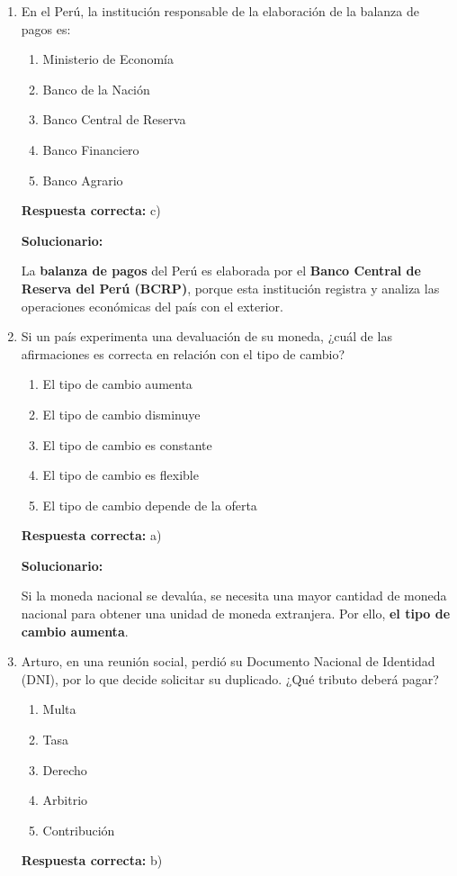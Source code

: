 \begin{enumerate}[resume]
	
	\item En el Perú, la institución responsable de la elaboración de la balanza de pagos es:
	\begin{enumerate}[label=\alph*)]
		\item Ministerio de Economía
		\item Banco de la Nación
		\item Banco Central de Reserva
		\item Banco Financiero
		\item Banco Agrario
	\end{enumerate}
	\textbf{Respuesta correcta:} c)
	
	\vspace{2mm}
	\textbf{Solucionario:}
	
	La \textbf{balanza de pagos} del Perú es elaborada por el \textbf{Banco Central de Reserva del Perú (BCRP)}, porque esta institución registra y analiza las operaciones económicas del país con el exterior.
	
	\vspace{6mm}
	
	\item Si un país experimenta una devaluación de su moneda, ¿cuál de las afirmaciones es correcta en relación con el tipo de cambio?
	\begin{enumerate}[label=\alph*)]
		\item El tipo de cambio aumenta
		\item El tipo de cambio disminuye
		\item El tipo de cambio es constante
		\item El tipo de cambio es flexible
		\item El tipo de cambio depende de la oferta
	\end{enumerate}
	\textbf{Respuesta correcta:} a)
	
	\vspace{2mm}
	\textbf{Solucionario:}
	
	Si la moneda nacional se devalúa, se necesita una mayor cantidad de moneda nacional para obtener una unidad de moneda extranjera. Por ello, \textbf{el tipo de cambio aumenta}.
	
	\vspace{6mm}
	
	\item Arturo, en una reunión social, perdió su Documento Nacional de Identidad (DNI), por lo que decide solicitar su duplicado. ¿Qué tributo deberá pagar?
	\begin{enumerate}[label=\alph*)]
		\item Multa
		\item Tasa
		\item Derecho
		\item Arbitrio
		\item Contribución
	\end{enumerate}
	\textbf{Respuesta correcta:} b)
	

\end{enumerate}
